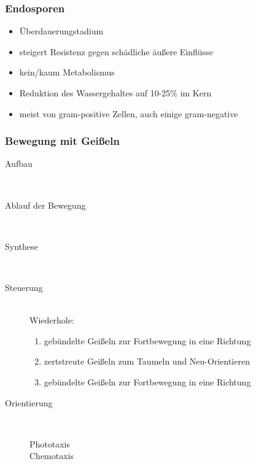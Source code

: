 \subsubsection{Endosporen}
	
	\begin{itemize}
		\item Überdauerungstadium
		\item steigert Resistenz gegen schädliche äußere Einflüsse
		\item kein/kaum Metabolismus
		\item Reduktion des Wassergehaltes auf 10-25\% im Kern
		\item meist von gram-positive Zellen, auch einige gram-negative
	\end{itemize}

\subsubsection{Bewegung mit Geißeln}

\begin{description}
	\item[Aufbau] \hfill \\

	\item[Ablauf der Bewegung] \hfill \\

	\item[Synthese] \hfill \\

	\item[Steuerung] \hfill \\
		Wiederhole:
		\begin{enumerate}
			\item gebündelte Geißeln zur Fortbewegung in eine Richtung
			\item zertstreute Geißeln zum Taumeln und Neu-Orientieren
			\item gebündelte Geißeln zur Fortbewegung in eine Richtung
		\end{enumerate}

	\item[Orientierung] \hfill \\
		\begin{description}
			\item[Phototaxis]
			\item[Chemotaxis]
		\end{description}

\end{description}

